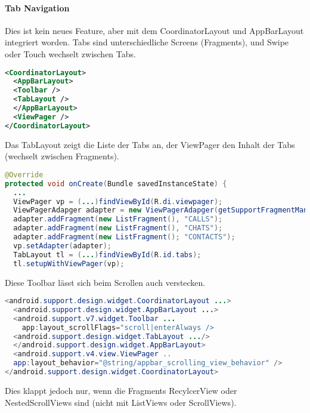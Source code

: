 \paragraph{Tab Navigation} Dies ist kein neues Feature, aber mit dem CoordinatorLayout und AppBarLayout integriert worden. Tabs sind unterschiedliche Screens (Fragments), und Swipe oder Touch wechselt zwischen Tabs.
\begin{lstlisting}[language=xml]
<CoordinatorLayout>
  <AppBarLayout>
  <Toolbar />
  <TabLayout />
  </AppBarLayout>
  <ViewPager />
</CoordinatorLayout>
\end{lstlisting}
Das TabLayout zeigt die Liste der Tabs an, der ViewPager den Inhalt der Tabs (wechselt zwischen Fragments).
\begin{lstlisting}[language=java]
@Override
protected void onCreate(Bundle savedInstanceState) {
  ...
  ViewPager vp = (...)findViewById(R.di.viewpager);
  ViewPagerAdapger adapter = new ViewPagerAdapger(getSupportFragmentManager());
  adapter.addFragment(new ListFragment(), "CALLS");
  adapter.addFragment(new ListFragment(), "CHATS");
  adapter.addFragment(new ListFragment(); "CONTACTS");
  vp.setAdapter(adapter);
  TabLayout tl = (...)findViewById(R.id.tabs);
  tl.setupWithViewPager(vp);
\end{lstlisting}
Diese Toolbar lässt sich beim Scrollen auch verstecken.
\begin{lstlisting}[language=java]
<android.support.design.widget.CoordinatorLayout ...>
  <android.support.design.widget.AppBarLayout ...>
  <android.support.v7.widget.Toolbar ...
    app:layout_scrollFlags="scroll|enterAlways />
  <android.support.design.widget.TabLayout .../>
  </android.support.design.widget.AppBarLayout>
  <android.support.v4.view.ViewPager ..
  app:layout_behavior="@string/appbar_scrolling_view_behavior" />
</android.support.design.widget.CoordinatorLayout>
\end{lstlisting}
Dies klappt jedoch nur, wenn die Fragments RecylcerView oder NestedScrollViews sind (nicht mit ListViews oder ScrollViews).